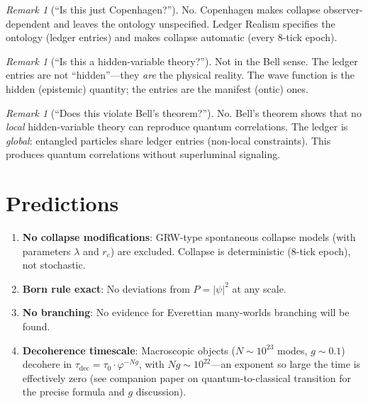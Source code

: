 \documentclass[12pt,a4paper]{article}
\theoremstyle{definition}
\theoremstyle{remark}
\newtheorem{remark}[theorem]{Remark}
\begin{document}
\begin{remark}[``Is this just Copenhagen?'']
No.  Copenhagen makes collapse observer-dependent and leaves the
ontology unspecified.  Ledger Realism specifies the ontology
(ledger entries) and makes collapse automatic (every 8-tick
epoch).
\end{remark}

\begin{remark}[``Is this a hidden-variable theory?'']
Not in the Bell sense.  The ledger entries are not ``hidden''---they
\emph{are} the physical reality.  The wave function is the hidden
(epistemic) quantity; the entries are the manifest (ontic) ones.
\end{remark}

\begin{remark}[``Does this violate Bell's theorem?'']
No.  Bell's theorem shows that no \emph{local} hidden-variable
theory can reproduce quantum correlations.  The ledger is
\emph{global}: entangled particles share ledger entries (non-local
constraints).  This produces quantum correlations without
superluminal signaling.
\end{remark}

\section{Predictions}
\label{sec:predictions}

\begin{enumerate}
  \item \textbf{No collapse modifications}: GRW-type spontaneous
  collapse models (with parameters $\lambda$ and $r_c$) are
  excluded.  Collapse is deterministic (8-tick epoch), not
  stochastic.

  \item \textbf{Born rule exact}: No deviations from
  $P = |\psi|^2$ at any scale.

  \item \textbf{No branching}: No evidence for Everettian
  many-worlds branching will be found.

  \item \textbf{Decoherence timescale}: Macroscopic objects
  ($N \sim 10^{23}$ modes, $g \sim 0.1$) decohere in
  $\tau_{\mathrm{dec}} = \tau_0 \cdot \varphi^{-Ng}$, with
  $Ng \sim 10^{22}$---an exponent so large the time is
  effectively zero (see companion paper on quantum-to-classical
  transition for the precise formula and $g$ discussion).
\end{enumerate}
\end{document}
